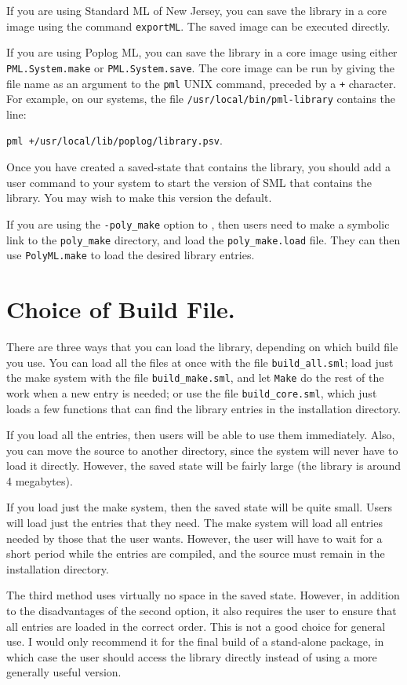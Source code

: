 If you are using Standard ML of New Jersey, you can save the library
in a core image using the command {\tt exportML}.  The saved image can
be executed directly.

If you are using Poplog ML, you can save the library in a core image
using either {\tt PML.System.make} or {\tt PML.System.save}.  The core image
can be run by giving the file name as an argument to the {\tt pml}
{\small UNIX} command, preceded by a \verb-+- character.  For example,
on our systems, the file {\tt /usr/local/bin/pml-library} contains
the line:

{\tt pml +/usr/local/lib/poplog/library.psv}.

Once you have created a saved-state that contains the library, you
should add a user command to your system to start the version of SML
that contains the library.  You may wish to make this version the
default.

If you are using the {\tt -poly\_make} option to \install, then users
need to make a symbolic link to the {\tt poly\_make} directory, and
load the {\tt poly\_make.load} file.  They can then use {\tt PolyML.make}
to load the desired library entries.


\section{Choice of Build File.}

There are three ways that you can load the
library, depending on which build file you use.  You can load all
the files at once with the file {\tt build\_all.sml}; load just the
make system with the file {\tt build\_make.sml}, and let {\tt Make} do
the rest of the work when a new entry is needed; or use the file
{\tt build\_core.sml}, which just loads a
few functions that can find the library entries in the installation
directory.

If you load all the entries, then users will be able to use them
immediately.  Also, you can move the source to another directory,
since the system will never have to load it directly.  However,
the saved state will be fairly large (the library is around 4
megabytes).

If you load just the make system, then the saved state will be
quite small.  Users will load just the entries that they need.
The make system will load all entries needed by those
that the user wants.  However, the user will have to wait for
a short period while the entries are compiled, and the source
must remain in the installation directory.

The third method uses virtually no space in the saved state.
However, in addition to the disadvantages of the second option,
it also requires the user to ensure that all entries are loaded
in the correct order.  This is not a good choice for general use.
I would only recommend it for the final build of a stand-alone
package, in which case the user should access the library
directly instead of using a more generally useful version.

 

